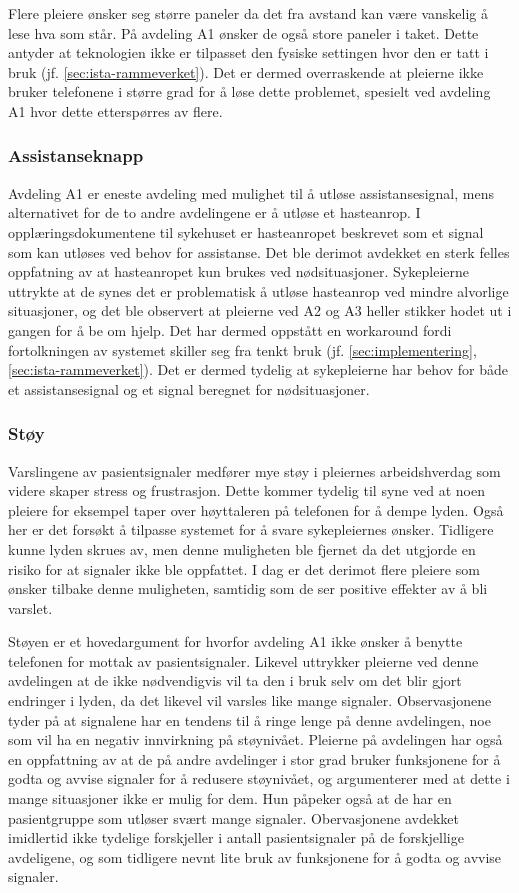 \noindent
Flere pleiere ønsker seg større paneler da det fra avstand kan være vanskelig å lese hva som står. På avdeling A1 ønsker de også store paneler i taket. Dette antyder at teknologien ikke er tilpasset den fysiske settingen hvor den er tatt i bruk (jf. \ref{sec:ista-rammeverket}). Det er dermed overraskende at pleierne ikke bruker telefonene i større grad for å løse dette problemet, spesielt ved avdeling A1 hvor dette etterspørres av flere.

\subsubsection{Assistanseknapp}
Avdeling A1 er eneste avdeling med mulighet til å utløse assistansesignal, mens alternativet for de to andre avdelingene er å utløse et hasteanrop. I opplæringsdokumentene til sykehuset er hasteanropet beskrevet som et signal som kan utløses ved behov for assistanse. Det ble derimot avdekket en sterk felles oppfatning av at hasteanropet kun brukes ved nødsituasjoner. Sykepleierne uttrykte at de synes det er problematisk å utløse hasteanrop ved mindre alvorlige situasjoner, og det ble observert at pleierne ved A2 og A3 heller stikker hodet ut i gangen for å be om hjelp. Det har dermed oppstått en workaround fordi fortolkningen av systemet skiller seg fra tenkt bruk (jf. \ref{sec:implementering}, \ref{sec:ista-rammeverket}). Det er dermed tydelig at sykepleierne har behov for både et assistansesignal og et signal beregnet for nødsituasjoner.
  
\subsubsection{Støy}
Varslingene av pasientsignaler medfører mye støy i pleiernes arbeidshverdag som videre skaper stress og frustrasjon. Dette kommer tydelig til syne ved at noen pleiere for eksempel taper over høyttaleren på telefonen for å dempe lyden. Også her er det forsøkt å tilpasse systemet for å svare sykepleiernes ønsker. Tidligere kunne lyden skrues av, men denne muligheten ble fjernet da det utgjorde en risiko for at signaler ikke ble oppfattet. I dag er det derimot flere pleiere som ønsker tilbake denne muligheten, samtidig som de ser positive effekter av å bli varslet. 

\noindent
Støyen er et hovedargument for hvorfor avdeling A1 ikke ønsker å benytte telefonen for mottak av pasientsignaler. Likevel uttrykker pleierne ved denne avdelingen at de ikke nødvendigvis vil ta den i bruk selv om det blir gjort endringer i lyden, da det likevel vil varsles like mange signaler. Observasjonene tyder på at signalene har en tendens til å ringe lenge på denne avdelingen, noe som vil ha en negativ innvirkning på støynivået. Pleierne på avdelingen har også en oppfattning av at de på andre avdelinger i stor grad bruker funksjonene for å godta og avvise signaler for å redusere støynivået, og argumenterer med at dette i mange situasjoner ikke er mulig for dem. Hun påpeker også at de har en pasientgruppe som utløser svært mange signaler. Obervasjonene avdekket imidlertid ikke tydelige forskjeller i antall pasientsignaler på de forskjellige avdeligene, og som tidligere nevnt lite bruk av funksjonene for å godta og avvise signaler.

